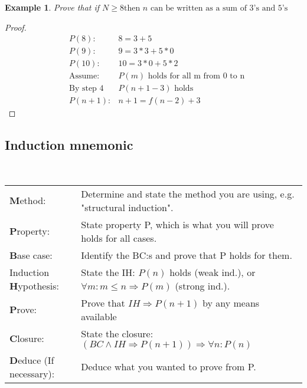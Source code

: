 \documentclass{article}
\newtheorem{example}[theorem]{Example}
\begin{document}
\begin{example}
    Prove that if $ N \geq8 \text{then } n \text{ can be written as a sum of 3's and 5's}$
\end{example}

\begin{proof}
    \begin{align}
        &P(8): & 8 = 3 + 5 \\
        &P(9): & 9 = 3*3 + 5*0 \\ 
        &P(10): & 10 = 3 * 0 + 5*2 \\
        &\text{Assume:} & P(m) \text{ holds for all m from 0 to n} \\
        &\text{By step 4}  &P(n+1-3) \text{ holds} \\
        &P(n+1): & n+1 = f(n-2) + 3
    \end{align}
\end{proof}

\subsection{Induction mnemonic}

\
\begin{center}
\noindent{}
\end{center}

\begin{tabular}{l l}
    \textbf{M}ethod: &Determine and state the method you are using, e.g. "structural induction". \\
    \textbf{P}roperty: &State property P, which is what you will prove holds for all cases. \\
    \textbf{B}ase case: &Identify the BC:s and prove that P holds for them. \\
    Induction \textbf{H}ypothesis: &State the IH: $P(n)$ holds (weak ind.), or $\forall m: m \leq n \Rightarrow P(m)$ (strong ind.). \\
    \textbf{P}rove: & Prove that $IH \Rightarrow P(n+1)$ by any means available \\
    \textbf{C}losure: &State the closure: $ (BC \land IH \Rightarrow P(n+1)) \Rightarrow \forall n: P(n) $ \\
\textbf{D}educe (If necessary): &Deduce what you wanted to prove from P.
\end{tabular}
\end{document}
